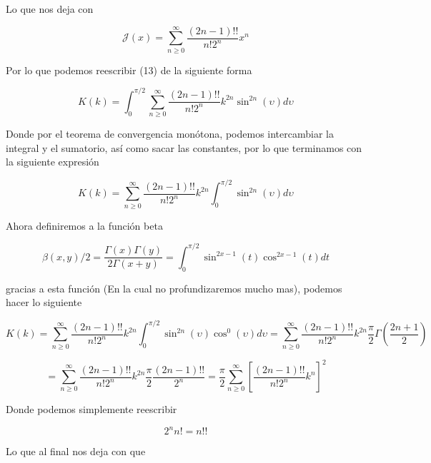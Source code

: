 \documentclass[]{article}
\begin{document}
	Lo que nos deja con
	
	\begin{equation}
		\mathcal{J}(x) = \sum_{n \geq 0}^{\infty} \frac{(2n-1)!!}{n!2^n}x^n
	\end{equation}

	Por lo que podemos reescribir (13) de la siguiente forma
	
	\begin{equation}
		K(k) = \int_{0}^{\pi/2}\sum_{n \geq 0}^{\infty} \frac{(2n-1)!!}{n!2^n}k^{2n}\sin^{2n}(\upsilon)d\upsilon
	\end{equation}

	Donde por el teorema de convergencia monótona, podemos intercambiar la integral y el sumatorio, así como sacar las constantes, por lo que terminamos con la siguiente expresión
	
	\begin{equation}
		K(k) = \sum_{n \geq 0}^{\infty} \frac{(2n-1)!!}{n!2^n}k^{2n}\int_{0}^{\pi/2}\sin^{2n}(\upsilon)d\upsilon
	\end{equation}

	Ahora definiremos a la función beta
	
	\begin{equation}
		\beta(x,y)/2 = \frac{\Gamma(x)\Gamma(y)}{2\Gamma(x+y)} = \int_{0}^{\pi/2}\sin^{2x-1}(t)\cos^{2x-1}(t)dt
	\end{equation}

	gracias a esta función (En la cual no profundizaremos mucho mas), podemos hacer lo siguiente
	
	\begin{equation*}
		K(k) = \sum_{n \geq 0}^{\infty} \frac{(2n-1)!!}{n!2^n}k^{2n}\int_{0}^{\pi/2}\sin^{2n}(\upsilon)\cos^0(\upsilon)d\upsilon = \sum_{n \geq 0}^{\infty} \frac{(2n-1)!!}{n!2^n}k^{2n}\frac{\pi}{2}\Gamma\left(\frac{2n+1}{2}\right)
	\end{equation*}

	\begin{equation}
		 = \sum_{n \geq 0}^{\infty} \frac{(2n-1)!!}{n!2^n}k^{2n}\frac{\pi}{2}\frac{(2n-1)!!}{2^n} = \frac{\pi}{2}\sum_{n \geq 0}^{\infty} \left[\frac{(2n-1)!!}{n!2^n}k^{n}\right]^2
	\end{equation}

	Donde podemos simplemente reescribir
	
	\begin{equation*}
		2^nn! = n!!
	\end{equation*}

	Lo que al final nos deja con que
	
\end{document}
